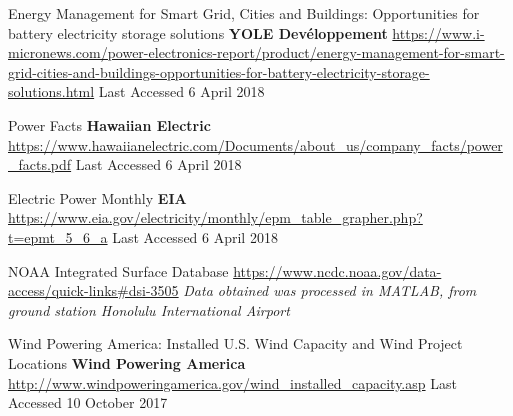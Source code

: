 \begin{thebibliography}{5}
        Energy Management for Smart Grid, Cities and Buildings: Opportunities for battery electricity storage solutions
        \textbf{YOLE Dev\'eloppement}
        \url{https://www.i-micronews.com/power-electronics-report/product/energy-management-for-smart-grid-cities-and-buildings-opportunities-for-battery-electricity-storage-solutions.html}
        Last Accessed 6 April 2018

        Power Facts
        \textbf{Hawaiian Electric}
        \url{https://www.hawaiianelectric.com/Documents/about_us/company_facts/power_facts.pdf}
        Last Accessed 6 April 2018

        Electric Power Monthly
        \textbf{EIA}
        \url{https://www.eia.gov/electricity/monthly/epm_table_grapher.php?t=epmt_5_6_a}
        Last Accessed 6 April 2018

        NOAA Integrated Surface Database
        \url{https://www.ncdc.noaa.gov/data-access/quick-links#dsi-3505}
        \emph{Data obtained was processed in MATLAB, from ground station Honolulu International Airport}

        Wind Powering America: Installed U.S. Wind Capacity and Wind Project Locations
        \textbf{Wind Powering America}
        \url{http://www.windpoweringamerica.gov/wind_installed_capacity.asp}
        Last Accessed 10 October 2017
\end{thebibliography}